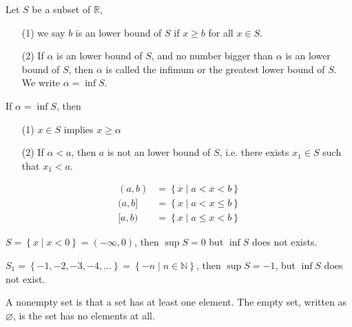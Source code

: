 \begin{definition}
  Let \(S\) be a subset of \(\mathbb{R} \), 
  \begin{itemize}
    \item [(1)] we say \(b\) is an lower bound of \(S\) if \(x \ge b\) for all \(x \in S\). 
    \item [(2)] If \(\alpha \) is an lower bound of \(S\), and no number bigger than \(\alpha \) is an lower bound of \(S\), then \(\alpha \) is called the infimum or the greatest lower bound of \(S\). We write \(\alpha  = \inf S\).          
  \end{itemize}  
\end{definition}

\begin{corollary}
  If \(\alpha  = \inf S\), then 
  \begin{itemize}
    \item [(1)] \(x \in S\) implies \(x \ge \alpha \)
    \item [(2)] If \(\alpha  < a\), then \(a\) is not an lower bound of \(S\), i.e. there exists \(x_1 \in S\) such that \(x_1 < a\).       
  \end{itemize} 
\end{corollary}

\begin{notation}
 \begin{align*}
  (a, b) &= \left\{ x \mid a < x < b \right\} \\
  (a,b] &= \left\{ x \mid a < x \le b \right\} \\ 
  [a, b) &= \left\{ x \mid a \le x < b \right\}  
 \end{align*}
\end{notation}

\begin{eg}
  \(S = \left\{ x \mid x<0 \right\} = (-\infty , 0)\), then \(\sup S = 0\) but \(\inf S\) does not exists.    
\end{eg}

\begin{eg}
  \(S_1 = \left\{ -1, -2, -3, -4, \dots  \right\} = \left\{ -n \mid n \in \mathbb{N}  \right\}  \), then \(\sup S = -1\), but \(\inf S\) does not exist.    
\end{eg}

\begin{definition}
  A nonempty set is that a set has at least one element. The empty set, written as \(\varnothing \), is the set has no elements at all. 
\end{definition}

